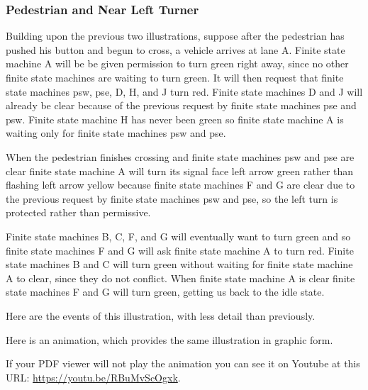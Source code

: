 \documentclass[letterpaper,twoside]{article}
\begin{document}


\subsubsection{Pedestrian and Near Left Turner}

Building upon the previous two illustrations, suppose after the pedestrian
has pushed his button and begun to cross, a vehicle arrives at lane A.
Finite state machine A will be be given permission to turn green right away,
since no other finite state machines are waiting to turn green.
It will then request that finite state machines psw, pse, D, H, and J
turn red.  Finite state machines D and J
will already be clear because of the previous request by finite state
machines pse and psw.
Finite state machine H has never been green so finite state machine A
is waiting only for finite state machines psw and pse.

When the pedestrian finishes crossing and finite state machines
psw and pse are clear finite state machine A will turn its signal face
left arrow green rather than flashing left arrow yellow because
finite state machines F and G are clear due to the previous request
by finite state machines psw and pse,
so the left turn is protected rather than permissive.

Finite state machines B, C, F, and G will eventually want to turn green
and so finite state machines F and G will ask finite state machine
A to turn red.  Finite state machines B and C
will turn green without waiting for finite state machine A to clear, since
they do not conflict.  When finite state machine A is clear finite state
machines F and G will turn green, getting us back to the idle state.

Here are the events of this illustration, with less detail than
previously.



Here is an animation, which provides the same illustration in graphic form.

\noindent{}

If your PDF viewer will not play the animation you can see it on Youtube
at this URL:
\href{https://youtu.be/RBuMvScOgxk}{https://youtu.be/RBuMvScOgxk}.
\end{document}
